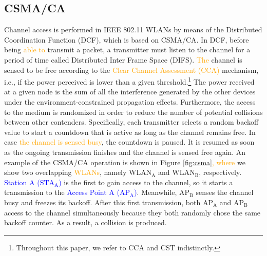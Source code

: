 \documentclass[preprint,12pt]{elsarticle}
\begin{document}
\subsection{CSMA/CA}
\label{section:csma}	
Channel access is performed in IEEE 802.11 WLANs by means of the Distributed Coordination Function (DCF), which is based on CSMA/CA. In DCF, before being \textcolor{orange}{able to} transmit a packet, a transmitter must listen to the channel for a period of time called Distributed Inter Frame Space (DIFS). \textcolor{orange}{The} channel is sensed to be free according to the \textcolor{orange}{Clear Channel Assessment (CCA)} mechanism, i.e., if the power perceived is lower than a given threshold.\footnote{Throughout this paper, we refer to CCA and CST indistinctly.} The power received at a given node is the sum of all the interference generated by the other devices under the environment-constrained propagation effects. Furthermore, the access to the medium is randomized in order to reduce the number of potential collisions between other contenders. Specifically, each transmitter selects a random backoff value to start a countdown that is active as long as the channel remains free. In case \textcolor{orange}{the channel is sensed busy}, the countdown is paused. It is resumed as soon as the ongoing transmission finishes and the channel is sensed free again. An example of the CSMA/CA operation is shown in Figure \ref{fig:csma}\textcolor{orange}{, where} we show two overlapping \textcolor{orange}{WLANs}, namely $\text{WLAN}_{\text{A}}$ and $\text{WLAN}_{\text{B}}$, respectively. \textcolor{blue}{Station A ($\text{STA}_{\text{A}}$)} is the first to gain access to the channel, so it starts a transmission to the \textcolor{blue}{Access Point A ($\text{AP}_\text{A}$)}. Meanwhile, $\text{AP}_{\text{B}}$ senses the channel busy and freezes its backoff. After this first transmission, both $\text{AP}_{\text{A}}$ and $\text{AP}_{\text{B}}$ access to the channel simultaneously because they both randomly chose the same backoff counter. As a result, a collision is produced.
\end{document}
